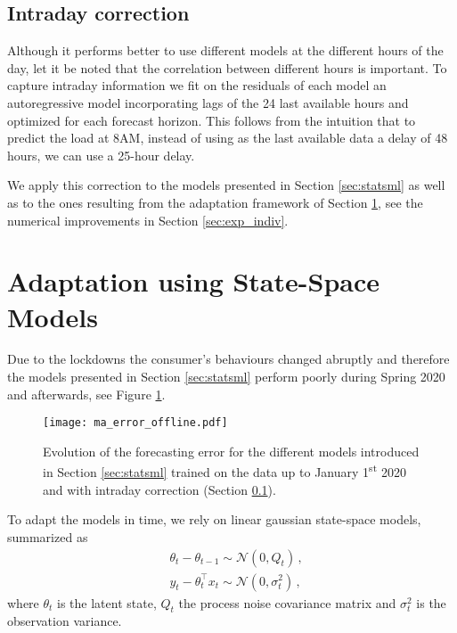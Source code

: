 \documentclass[transmag]{IEEEtran}
\begin{document}
\subsection{Intraday correction}\label{sec:intraday}
Although it performs better to use different models at the different hours of the day, let it be noted that the correlation between different hours is important. To capture intraday information we fit on the residuals of each model an autoregressive model incorporating lags of the 24 last available hours and optimized for each forecast horizon. This follows from the intuition that to predict the load at 8AM, instead of using as the last available data a delay of 48 hours, we can use a 25-hour delay.

We apply this correction to the models presented in Section \ref{sec:statsml} as well as to the ones resulting from the adaptation framework of Section \ref{sec:adaptation}, see the numerical improvements in Section \ref{sec:exp_indiv}.




\section{Adaptation using State-Space Models}\label{sec:adaptation}
Due to the lockdowns the consumer's behaviours changed abruptly and therefore the models presented in Section \ref{sec:statsml} perform poorly during Spring 2020 and afterwards, see Figure \ref{fig:adaptation_motivation}.
\begin{figure}
    \centering
    \texttt{[image: ma\_error\_offline.pdf]}
    \caption{Evolution of the forecasting error for the different models introduced in Section \ref{sec:statsml} trained on the data up to January 1\textsuperscript{st} 2020 and with intraday correction (Section \ref{sec:intraday}).}
    \label{fig:adaptation_motivation}
\end{figure}
To adapt the models in time, we rely on linear gaussian state-space models, summarized as
\begin{align*}
    & \theta_t - \theta_{t-1} \sim \mathcal{N}(0,Q_t)\,, \\
	& y_t - \theta_t^\top x_t \sim \mathcal{N}(0,\sigma_t^2) \,,
\end{align*}
where $\theta_t$ is the latent state, $Q_t$ the process noise covariance matrix and $\sigma_t^2$ is the observation variance.
\end{document}
